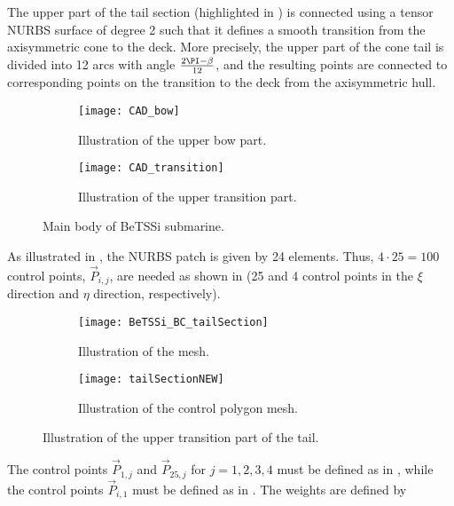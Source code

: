 The upper part of the tail section (highlighted in ) is connected using a tensor NURBS surface of degree 2 such that it defines a smooth transition from the axisymmetric cone to the deck. More precisely, the upper part of the cone tail is divided into 12 arcs with angle $\frac{2\PI-\beta}{12}$, and the resulting points are connected to corresponding points on the transition to the deck from the axisymmetric hull. 
\begin{figure}
	\centering    
	\begin{subfigure}{0.49\textwidth}
		\centering
		\texttt{[image: CAD\_bow]}
		\caption{Illustration of the upper bow part.}
		\label{Fig3:bettsi_upperBow}
	\end{subfigure}%
	\hspace*{0.02\textwidth}%
	\begin{subfigure}{0.49\textwidth}
		\centering
		\texttt{[image: CAD\_transition]}
		\caption{Illustration of the upper transition part.}
		\label{Fig3:bettsi_upperPartOfTailSection}
	\end{subfigure}
	\caption{Main body of BeTSSi submarine.}
\end{figure}
As illustrated in , the NURBS patch is given by 24 elements. Thus, $4\cdot 25 = 100$ control points, $\vec{P}_{i,j}$, are needed as shown in  (25 and 4 control points in the $\xi$ direction and $\eta$ direction, respectively).
\begin{figure}
	\centering    
	\begin{subfigure}{0.49\textwidth}
		\centering
		\texttt{[image: BeTSSi\_BC\_tailSection]}
		\caption{Illustration of the mesh.}
		\label{Fig3:BeTSSi_BC_tailSection}
	\end{subfigure}%
	\hspace*{0.02\textwidth}%
	\begin{subfigure}{0.49\textwidth}
		\centering
		\texttt{[image: tailSectionNEW]}
		\caption{Illustration of the control polygon mesh.}
		\label{Fig3:BeTSSi_BC_tailSection_cp}
	\end{subfigure}
	\caption{Illustration of the upper transition part of the tail.}
\end{figure}
The control points $\vec{P}_{1,j}$ and $\vec{P}_{25,j}$ for $j=1,2,3,4$ must be defined as in , while the control points $\vec{P}_{i,1}$ must be defined as in . The weights are defined by
